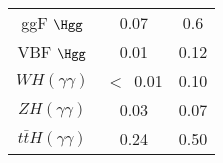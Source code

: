 \begin{tabular}{|c|c|c|}
\hline
ggF $\Hgg$                &  0.07  &  0.6  \\
VBF $\Hgg$                &  0.01  &  0.12 \\
$WH(\gamma\gamma)$        &$<$~0.01&  0.10 \\
$ZH(\gamma\gamma)$        &  0.03  &  0.07 \\
$t\bar{t}H(\gamma\gamma)$ &  0.24  &  0.50 \\
\hline
\end{tabular}
